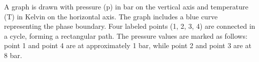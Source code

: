 A graph is drawn with pressure (p) in bar on the vertical axis and temperature (T) in Kelvin on the horizontal axis. The graph includes a blue curve representing the phase boundary. Four labeled points (1, 2, 3, 4) are connected in a cycle, forming a rectangular path. The pressure values are marked as follows: point 1 and point 4 are at approximately 1 bar, while point 2 and point 3 are at 8 bar.